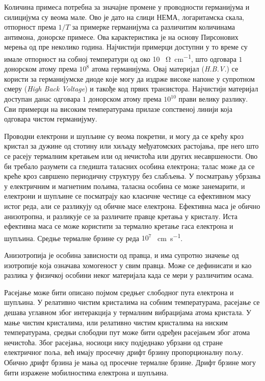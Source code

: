 \documentclass{article}
\begin{document}
Количина примеса потребна за значајне промене у проводности германијума и силицијума су веома мале. Ово је дато на слици НЕМА, логаритамска скала, отпорност према $1/T$ за примерке германијума са различитим количинама антимона, донорске примесе. Ова карактеристика је на основу Пирсонових мерења од пре неколико година. Најчистији примерци доступни у то време су имале отпорност на собној температури од око 10 \SI{}{\ohm\per\centi\meter}, што одговара $1$ донорском атому према $10^8$ атома германијума. Овај материјал (\textit{H.B.V.}) се користи за германијумске диоде које могу да издрже високе напоне у супротном смеру (\textit{High Back Voltage}) и такође код првих транзистора. Најчистији материјал доступан данас одговара $1$ донорском атому према $10^{10}$ прави велику разлику. Сви примерци на високим температурама прилазе сопственој линији која одговара чистом германијуму.

Проводни електрони и шупљине су веома покретни, и могу да се крећу кроз кристал за дужине од стотину или хиљаду међуатомских растојања, пре него што се расеју термалним кретањем или од нечистоћа или других несавршености. Ово би требало разумети са гледишта таласних особина електрона; талас може да се креће кроз савршено периодичну структуру без слабљења. У посматрању убрзања у електричним и магнетним пољима, таласна особина се може занемарити, и електрони и шупљине се посматрају као класичне честице са ефективном масу истог реда, али се разликују од обичне масе електрона. Ефективна маса је обично анизотропна, и разликује се за различите правце кретања у кристалу. Иста ефективна маса се може користити за термално кретање гаса електрона и шупљина. Средње термалне брзине су реда $10^7$ \SI{}{\centi\meter\per\second}.


\begin{info}
	Анизотропија је особина зависности од правца, и има супротно значење од изотропије која означава хомогеност у свим правца. Може се дефинисати и као разлика у физичкој особини неког материјала када се мери у различитим осама.
\end{info}

Расејање може бити описано појмом средњег слободног пута електрона и шупљина. У релативно чистим кристалима на собним температурама, расејање се дешава углавном због интеракција у термалним вибрацијама атома кристала. У мање чистим кристалима, или релативно чистим кристалима на ниским температурама, средњи слободни пут може бити одређен расејањем због атома нечистоћа. Због расејања, носиоци нису подједнако убрзани од стране електричног поља, већ имају просечну дрифт брзину пропорционалну пољу. Обично дрифт брзина је мања од просечне термалне брзине. Дрифт брзине могу бити изражене мобилностима електрона и шупљина.
\end{document}
